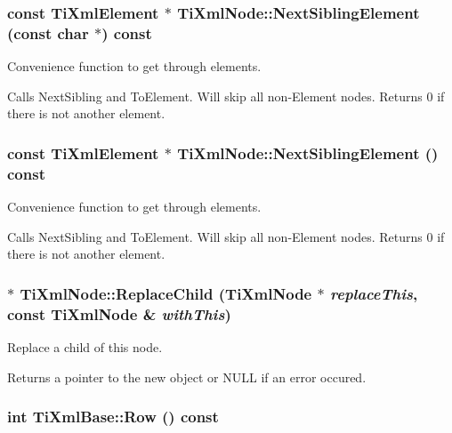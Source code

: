 \subsubsection{\setlength{\rightskip}{0pt plus 5cm}const {\bf Ti\-Xml\-Element} $\ast$ Ti\-Xml\-Node::Next\-Sibling\-Element (const char $\ast$) const\hspace{0.3cm}{\tt  [inherited]}}\label{classTiXmlNode_TiXmlUnknowna52}


Convenience function to get through elements. 

Calls Next\-Sibling and To\-Element. Will skip all non-Element nodes. Returns 0 if there is not another element.
\subsubsection{\setlength{\rightskip}{0pt plus 5cm}const {\bf Ti\-Xml\-Element} $\ast$ Ti\-Xml\-Node::Next\-Sibling\-Element () const\hspace{0.3cm}{\tt  [inherited]}}\label{classTiXmlNode_TiXmlUnknowna50}


Convenience function to get through elements. 

Calls Next\-Sibling and To\-Element. Will skip all non-Element nodes. Returns 0 if there is not another element.
\subsubsection{ $\ast$ Ti\-Xml\-Node::Replace\-Child ({\bf Ti\-Xml\-Node} $\ast$ {\em replace\-This}, const {\bf Ti\-Xml\-Node} \& {\em with\-This})\hspace{0.3cm}{\tt  [inherited]}}\label{classTiXmlNode_TiXmlUnknowna36}


Replace a child of this node. 

Returns a pointer to the new object or NULL if an error occured.
\subsubsection{\setlength{\rightskip}{0pt plus 5cm}int Ti\-Xml\-Base::Row () const\hspace{0.3cm}{\tt  [inline, inherited]}}\label{classTiXmlBase_TiXmlUnknowna78}


